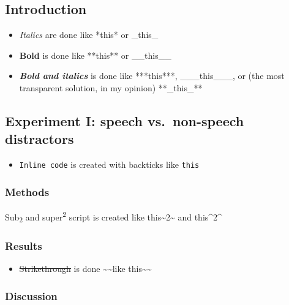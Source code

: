 \documentclass[a4paper, twoside]{templates/ociamthesis}
\providecommand{\tightlist}{%
  \setlength{\itemsep}{0pt}\setlength{\parskip}{0pt}}
\begin{document}
\hypertarget{introduction-1}{%
\subsection{Introduction}\label{introduction-1}}

\begin{itemize}
\tightlist
\item
  \emph{Italics} are done like *this* or \_this\_
\item
  \textbf{Bold} is done like **this** or \_\_this\_\_
\item
  \textbf{\emph{Bold and italics}} is done like ***this***, \_\_\_this\_\_\_, or (the most transparent solution, in my opinion) **\_this\_**
\end{itemize}

\hypertarget{experiment-i-speech-vs.-non-speech-distractors}{%
\subsection{Experiment I: speech vs.~non-speech distractors}\label{experiment-i-speech-vs.-non-speech-distractors}}

\begin{itemize}
\tightlist
\item
  \texttt{Inline\ code} is created with backticks like \texttt{\textasciigrave{}this\textasciigrave{}}
\end{itemize}

\hypertarget{methods}{%
\subsubsection{Methods}\label{methods}}

Sub\textsubscript{2} and super\textsuperscript{2} script is created like this\textasciitilde2\textasciitilde{} and this\^{}2\^{}

\hypertarget{results}{%
\subsubsection{Results}\label{results}}

\begin{itemize}
\tightlist
\item
  \sout{Strikethrough} is done \textasciitilde\textasciitilde like this\textasciitilde\textasciitilde{}
\end{itemize}

\hypertarget{discussion}{%
\subsubsection{Discussion}\label{discussion}}
\end{document}
